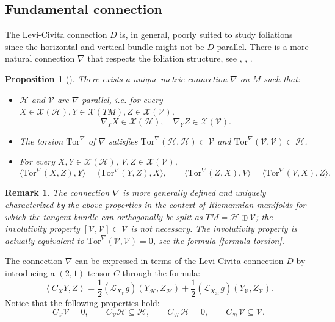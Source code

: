 \documentclass[11pt]{article}
\numberwithin{equation}{section}
\newtheorem{proposition}[theorem]{Proposition}
\newtheorem{remark}[theorem]{Remark}
\newcommand{\Ho}{\mathcal H}
\newcommand{\V}{\mathcal V}
\newcommand{\hor}{\mathcal H}
\newcommand{\ver}{\mathcal V}
\newcommand{\Tor}{\mathrm{Tor}}
\begin{document}
\subsection{Fundamental connection}
	
	The Levi-Civita connection $D$ is, in general, poorly suited to study foliations since the horizontal and vertical bundle might not be $D$-parallel.  There is a more natural connection $\nabla$   that respects the foliation structure, see  \cite{AGAG},  \cite{2025arXiv250913276B}, \cite{Hladky}.  
\begin{proposition}[\cite{Hladky}]
There exists a unique metric connection $\nabla$ on $M$ such that:
\begin{itemize}
\item $\mathcal{H}$ and $\mathcal{V}$ are $\nabla$-parallel, i.e. for every $X \in \mathcal{X}(\hor), Y \in \mathcal{X}(TM), Z \in \mathcal{X} (\V)$,
\begin{equation}
\nabla_Y X \in \mathcal{X}(\hor), \quad \nabla_Y Z \in \mathcal{X}(\V).
\end{equation}
\item The torsion $\Tor^\nabla$ of $\nabla$ satisfies $\Tor^\nabla(\hor,\hor) \subset \V$ and $\Tor^\nabla(\V,\V) \subset \mathcal{H}$.
\item For every $X,Y \in \mathcal{X}(\hor)$, $V,Z \in \mathcal{X} (\V)$, 
\begin{equation}
\langle \Tor^\nabla(X,Z),Y \rangle =\langle \Tor^\nabla(Y,Z),X \rangle, \qquad   \langle \Tor^\nabla(Z,X), V \rangle =\langle \Tor^\nabla(V,X), Z \rangle.
\end{equation}
\end{itemize}
\end{proposition}

\begin{remark}\label{involutivity assumption}
    The connection $\nabla$ is more generally defined and uniquely characterized by the above properties in the context of Riemannian manifolds for which the tangent bundle can orthogonally be split as $TM=\Ho \oplus \V$; the involutivity property $[\V,\V] \subset \V $ is not necessary. The involutivity property is actually equivalent to  $\Tor^\nabla(\V,\V) =0$, see the formula \eqref{formula torsion}.
\end{remark}

The connection $\nabla$ can be expressed in terms of the Levi-Civita connection $D$ by introducing a $(2,1)$ tensor $C$ through the formula:
\begin{equation}
\left\langle C_X Y, Z\right\rangle = \frac{1}{2} (\mathcal{L}_{X_\ver} g)(Y_\hor,Z_\hor) + \frac{1}{2}(\mathcal{L}_{X_\hor}g)(Y_\ver,Z_\ver).
\end{equation}
Notice that the following properties hold:
\begin{equation}
C_\ver \ver = 0,\qquad C_{\ver} \hor \subseteq \hor, \qquad C_\hor \hor = 0,\qquad C_{\hor} \ver \subseteq \ver.
\end{equation}
\end{document}
